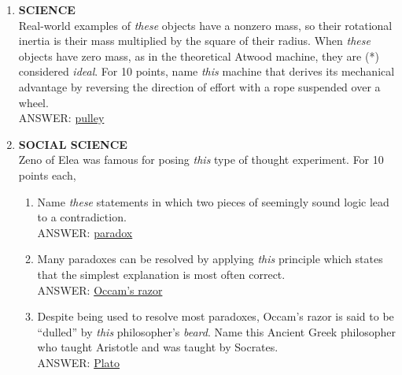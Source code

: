 \documentclass{report}
\newcommand*{\backtrack}{\setcounter{enumi}{\numexpr\theenumi-1\relax}}
\begin{document}
\begin{enumerate}
    \item \textbf{SCIENCE} \\ Real-world examples of \textit{these} objects have a nonzero mass, so their rotational inertia is their mass multiplied by the square of their radius. When \textit{these} objects have zero mass, as in the theoretical Atwood machine, they are (*) considered \textit{ideal}. For 10 points, name \textit{this} machine that derives its mechanical advantage by reversing the direction of effort with a rope suspended over a wheel. \\ ANSWER: \underline{pulley} \backtrack
    \item \textbf{SOCIAL SCIENCE} \\ Zeno of Elea was famous for posing \textit{this} type of thought experiment. For 10 points each,
    \begin{enumerate}[label=\Alph*]
        \item Name \textit{these} statements in which two pieces of seemingly sound logic lead to a contradiction. \\ ANSWER: \underline{paradox}
        \item Many paradoxes can be resolved by applying \textit{this} principle which states that the simplest explanation is most often correct. \\ ANSWER: \underline{Occam's razor}
        \item Despite being used to resolve most paradoxes, Occam's razor is said to be ``dulled'' by \textit{this} philosopher's \textit{beard}. Name this Ancient Greek philosopher who taught Aristotle and was taught by Socrates. \\ ANSWER: \underline{Plato}
    \end{enumerate}
    \newpage


\end{enumerate}
\end{document}
